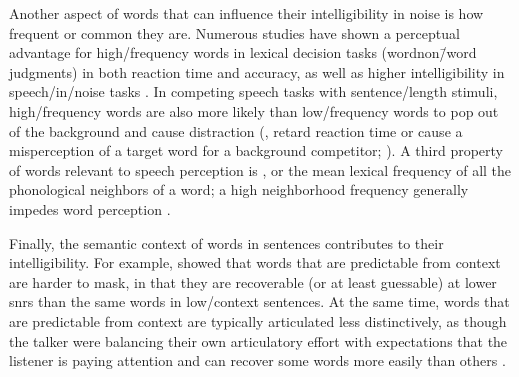 Another aspect of words that can influence their intelligibility in noise is how frequent or common they are.  Numerous studies have shown a perceptual advantage for high\-/frequency words in lexical decision tasks (word\slsh non\=/word judgments) in both reaction time and accuracy, as well as higher intelligibility in speech\-/in\-/noise tasks \citep[\eg,][]{Howes1957, Savin1963, VitevitchLuce1998, DirksEtAl2001, TakayanagiEtAl2002, VitevitchRodriguez2005}.  In competing speech tasks with sentence\-/length stimuli, high\-/frequency words are also more likely than low\-/frequency words to pop out of the background and cause distraction (\ie, retard reaction time or cause a misperception of a target word for a background competitor; \citealt{BoulengerEtAl2010}).  A third property of words relevant to speech perception is , or the mean lexical frequency of all the phonological neighbors of a word; a high neighborhood frequency generally impedes word perception \citep{LucePisoni1998}.  

Finally, the semantic context of words in sentences contributes to their intelligibility.  For example, \citet{LewisEtAl1988} showed that words that are predictable from context are harder to mask, in that they are recoverable (or at least guessable) at lower \ac{snr}s than the same words in low\-/context sentences.  At the same time, words that are predictable from context are typically articulated less distinctively, as though the talker were balancing their own articulatory effort with expectations that the listener is paying attention and can recover some words more easily than others \citep{Lindblom1990, Wright2004a}.



